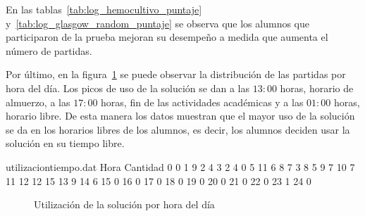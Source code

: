 En las tablas~\ref{tab:log_hemocultivo_puntaje}
y~\ref{tab:log_glasgow_random_puntaje} se observa que los alumnos que
participaron de la prueba mejoran su desempeño a medida que aumenta el número de
partidas. 


Por último, en la figura~\ref{fig:utilizacion_hora} se puede observar la
distribución de las partidas por hora del día. Los picos de uso de la solución
se dan a las $13:00$ horas, horario de almuerzo, a las $17:00$ horas, fin de las
actividades académicas y a las $01:00$ horas, horario libre. De esta manera los
datos muestran que el mayor uso de la solución se da en los horarios libres de
los alumnos, es decir, los alumnos deciden usar la solución en su tiempo libre.

\begin{filecontents}{utilizaciontiempo.dat}
Hora	Cantidad
 0	 0
 1	 9
 2	 4
 3	 2
 4	 0
 5	11
 6	 8
 7	 3
 8	 5
 9	 7
10	 7
11	12
12	15
13	 9
14	 6
15	 0
16	 0
17	 0
18	 0
19	 0
20	 0
21	 0
22	 0
23	 1
24	 0
\end{filecontents}

\begin{figure}[H]
	\centering
    \caption{Utilización de la solución por hora del día}
    \label{fig:utilizacion_hora}
\end{figure}
